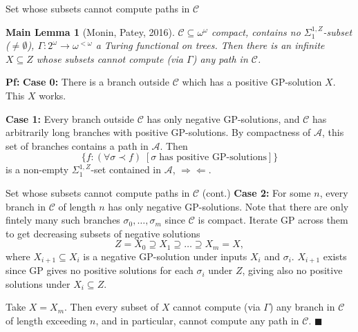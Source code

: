 \begin{frame}{Set whose subsets cannot compute paths in $\mathcal{C}$}
  \newtheorem*{main-lemma*}{Main Lemma}
  \begin{main-lemma*}[Monin, Patey, 2016]
    $\mathcal{C}\subseteq\omega^\omega$ compact, contains no
    $\Sigma_1^{1,Z}$-subset ($\neq\emptyset$),
    $\Gamma:2^{\omega}\rightarrow \omega^{<\omega}$ a Turing functional
    on trees. Then there is an infinite $X\subseteq Z$ whose subsets cannot
    compute (via $\Gamma$) any path in $\mathcal{C}$.
  \end{main-lemma*}

  \vspace{0.5em}
  \textbf{Pf:} \textbf{Case 0:} There is a branch outside
  $\mathcal{C}$ which has a positive GP-solution $X$. This $X$ works.

  \vspace{0.5em}
  \textbf{Case 1:} Every branch outside $\mathcal{C}$ has only negative
  GP-solutions, and $\mathcal{C}$ has arbitrarily long branches with
  positive GP-solutions. By compactness of $\mathcal{A}$, this set of
  branches contains a path in $\mathcal{A}$. Then
  \[\{f:(\forall \sigma\prec f)\; [\sigma\; \text{has
  positive GP-solutions}]\}\] is a non-empty $\Sigma_1^{1,Z}$-set contained
  in $\mathcal{A}$, $\Rightarrow\Leftarrow$.
\end{frame}

\begin{frame}{Set whose subsets cannot compute paths in $\mathcal{C}$
(cont.)}
  \textbf{Case 2:} For some $n$, every branch in $\mathcal{C}$ of length
  $n$ has only negative GP-solutions. Note that there are only fintely many
  such branches $\sigma_0,\ldots,\sigma_m$ since $\mathcal{C}$ is compact.
  Iterate GP across them to get decreasing subsets of negative solutions
  \[Z=X_0 \supseteq X_1 \supseteq \ldots\supseteq X_m=X,\]
  where $X_{i+1}\subseteq X_i$ is a negative GP-solution under inputs
  $X_i$ and $\sigma_i$. $X_{i+1}$ exists since GP gives no positive
  solutions for each $\sigma_i$ under $Z$, giving also no positive
  solutions under $X_i\subseteq Z$.
  
  \vspace{1em}
  Take $X=X_m$. Then every subset of $X$ cannot compute (via $\Gamma$) any
  branch in $\mathcal{C}$ of length exceeding $n$, and in particular,
  cannot compute any path in $\mathcal{C}$. $\blacksquare$
\end{frame}

